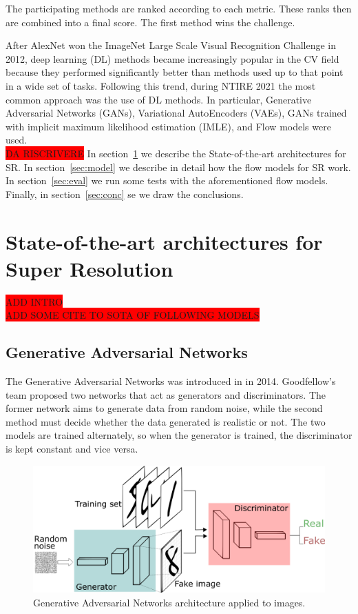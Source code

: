 \documentclass{article}
\begin{document}
\noindent The participating methods are ranked according to each metric. These ranks then are combined into a final score. The first method wins the challenge.

After AlexNet won the ImageNet Large Scale Visual Recognition Challenge in 2012, deep learning (DL) methods became increasingly popular in the CV field because they performed significantly better than methods used up to that point in a wide set of tasks. Following this trend, during NTIRE 2021 the most common approach was the use of DL methods. In particular, Generative Adversarial Networks (GANs), Variational AutoEncoders (VAEs), GANs trained with implicit maximum likelihood estimation (IMLE), and Flow models were used. \\ %

\colorbox{red}{DA RISCRIVERE}
In section~\ref{sec:sota}  we describe the State-of-the-art architectures for SR. In section~\ref{sec:model} we describe in detail how the flow models for SR work. In section~\ref{sec:eval} we run some tests with the aforementioned flow models. Finally, in section~\ref{sec:conc} se we draw the conclusions.

\section{State-of-the-art architectures for Super Resolution}\label{sec:sota}
\colorbox{red}{ADD INTRO} \\
\colorbox{red}{ADD SOME CITE TO SOTA OF FOLLOWING MODELS} \\

\subsection{Generative Adversarial Networks}
The Generative Adversarial Networks was introduced in \cite{gans} in 2014. Goodfellow's team proposed two networks that act as generators and discriminators. The former network aims to generate data from random noise, while the second method must decide whether the data generated is realistic or not. The two models are trained alternately, so when the generator is trained, the discriminator is kept constant and vice versa. 
\begin{figure}[h]
    \centering
    \includegraphics[scale=.3]{gan.png}
    \caption{Generative Adversarial Networks architecture applied to images.}
    \label{img:gan}
\end{figure}
\end{document}
